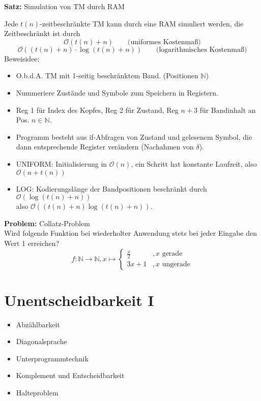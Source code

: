 \documentclass[a4paper,graphics,11pt]{article}
\begin{document}
\strut

\textbf{Satz:} Simulation von TM durch RAM

Jede $t(n)$-zeitbeschränkte TM kann durch eine RAM simuliert werden,
die Zeitbeschränkt ist durch
$$
    \mathcal{O}(t(n)+n)\qquad \text{(uniformes Kostenmaß)}
$$$$
    \mathcal{O}((t(n)+n)\cdot \log(t(n)+n))
    \qquad \text{(logarithmisches Kostenmaß)}
$$
Beweisidee:
\begin{itemize}
    \item O.b.d.A. TM mit 1-seitig beschränktem Band. (Positionen $\mathbb{N}$)
    \item Nummeriere Zustände und Symbole zum Speichern in Registern.
    \item Reg 1 für Index des Kopfes, Reg 2 für Zustand,
        Reg $n+3$ für Bandinhalt an Pos. $n \in \mathbb{N}$.
    \item Programm besteht aus if-Abfragen von Zustand und gelesenem Symbol, die
        dann entsprechende Register verändern (Nachahmen von $\delta$).
    \item UNIFORM: Initialisierung in $\mathcal{O}(n)$, ein Schritt hat konstante Laufzeit,
        also $\mathcal{O}(n+t(n))$
    \item LOG: Kodierungslänge der Bandpositionen beschränkt durch $\mathcal{O}(\log(t(n)+n))$\\
        also $\mathcal{O}((t(n)+n)\log(t(n)+n))$.
\end{itemize}

\strut

\textbf{Problem:} Collatz-Problem\\
Wird folgende Funktion bei wiederholter Anwendung stets bei jeder Eingabe
den Wert 1 erreichen?
$$
    f : \mathbb{N} \to \mathbb{N}, x \mapsto
    \begin{cases}
        \frac{x}{2} &, x \text{ gerade}\\
        3x+1 &, x \text{ ungerade}
    \end{cases}
$$



\newpage



\section{Unentscheidbarkeit I}

\begin{itemize}
    \item Abzählbarkeit
    \item Diagonalsprache
    \item Unterprogrammtechnik
    \item Komplement und Entscheidbarkeit
    \item Halteproblem
\end{itemize}
\end{document}

